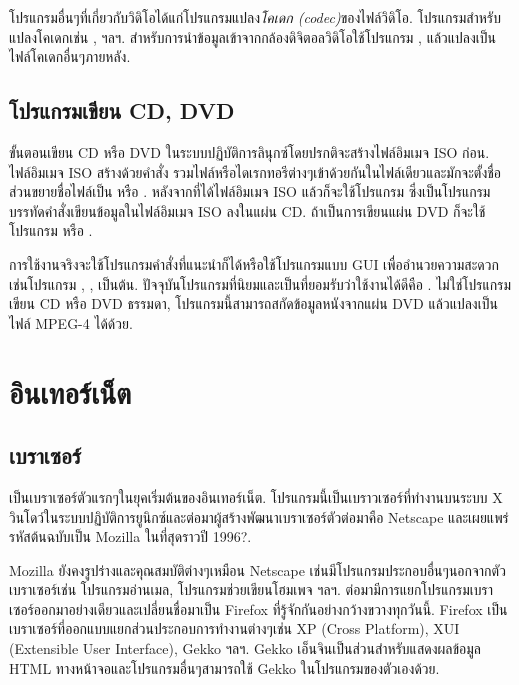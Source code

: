\begin{thwbr}
โปรแกรมอื่นๆที่เกี่ยวกับวิดิโอได้แก่โปรแกรมแปลง\emph{โคเดก (codec)}ของไฟล์วิดิโอ. โปรแกรมสำหรับแปลงโคเดกเช่น ,  ฯลฯ. สำหรับการนำข้อมูลเข้าจากกล้องดิจิตอลวิดิโอใช้โปรแกรม ,  แล้วแปลงเป็นไฟล์โคเดกอื่นๆภายหลัง.

\subsection{โปรแกรมเขียน CD, DVD}
ขั้นตอนเขียน CD หรือ DVD ในระบบปฏิบัติการลินุกซ์โดยปรกติจะสร้างไฟล์อิมเมจ ISO ก่อน. ไฟล์อิมเมจ ISO สร้างด้วยคำสั่ง  รวมไฟล์หรือไดเรกทอรีต่างๆเข้าด้วยกันในไฟล์เดียวและมักจะตั้งชื่อส่วนขยายชื่อไฟล์เป็น  หรือ . หลังจากที่ได้ไฟล์อิมเมจ ISO แล้วก็จะใช้โปรแกรม  ซึ่งเป็นโปรแกรมบรรทัดคำสั่งเขียนข้อมูลในไฟล์อิมเมจ ISO ลงในแผ่น CD. ถ้าเป็นการเขียนแผ่น DVD ก็จะใช้โปรแกรม  หรือ .

การใช้งานจริงจะใช้โปรแกรมคำสั่งที่แนะนำก็ได้หรือใช้โปรแกรมแบบ GUI เพื่ออำนวยความสะดวกเช่นโปรแกรม , ,  เป็นต้น. ปัจจุบันโปรแกรมที่นิยมและเป็นที่ยอมรับว่าใช้งานได้ดีคือ .  ไม่ใช่โปรแกรมเขียน CD หรือ DVD ธรรมดา, โปรแกรมนี้สามารถสกัดข้อมูลหนังจากแผ่น DVD แล้วแปลงเป็นไฟล์ MPEG-4 ได้ด้วย.

\begin{figure}[!hbt]
\end{figure}



\section{อินเทอร์เน็ต}

\subsection{เบราเซอร์}
 เป็นเบราเซอร์ตัวแรกๆในยุคเริ่มต้นของอินเทอร์เน็ต. โปรแกรมนี้เป็นเบราวเซอร์ที่ทำงานบนระบบ X วินโดว์ในระบบปฏิบัติการยูนิกซ์และต่อมาผู้สร้างพัฒนาเบราเซอร์ตัวต่อมาคือ Netscape และเผยแพร่รหัสต้นฉบับเป็น Mozilla ในที่สุดราวปี 1996?.

Mozilla ยังคงรูปร่างและคุณสมบัติต่างๆเหมือน Netscape เช่นมีโปรแกรมประกอบอื่นๆนอกจากตัวเบราเซอร์เช่น โปรแกรมอ่านเมล, โปรแกรมช่วยเขียนโฮมเพจ ฯลฯ. ต่อมามีการแยกโปรแกรมเบราเซอร์ออกมาอย่างเดียวและเปลี่ยนชื่อมาเป็น Firefox ที่รู้จักกันอย่างกว้างขวางทุกวันนี้. Firefox เป็นเบราเซอร์ที่ออกแบบแยกส่วนประกอบการทำงานต่างๆเช่น XP (Cross Platform), XUI (Extensible User Interface), Gekko ฯลฯ. Gekko เอ็นจินเป็นส่วนสำหรับแสดงผลข้อมูล HTML ทางหน้าจอและโปรแกรมอื่นๆสามารถใช้ Gekko ในโปรแกรมของตัวเองด้วย. 


\end{thwbr}
